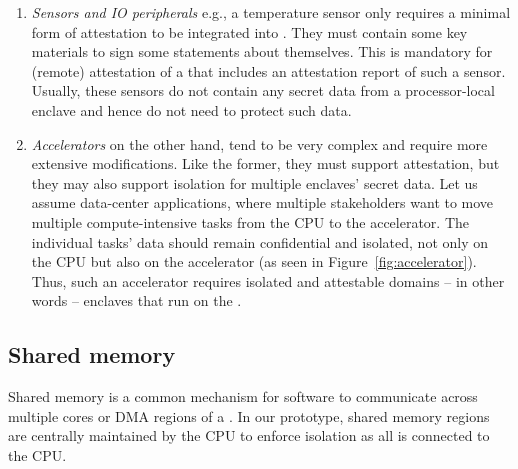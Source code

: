 \begin{enumerate}
\item\emph{Sensors and IO peripherals} e.g., a temperature sensor only requires a minimal form of attestation to be integrated into \name{}. They must contain some key materials to sign some statements about themselves. This is mandatory for (remote) attestation of a \nameenclave that includes an attestation report of such a sensor. Usually, these sensors do not contain any secret data from a processor-local enclave and hence do not need to protect such data.

\item\emph{Accelerators} on the other hand, tend to be very complex and require more extensive modifications. Like the former, they must support attestation, but they may also support isolation for multiple enclaves' secret data. Let us assume data-center applications, where multiple stakeholders want to move multiple compute-intensive tasks from the CPU to the accelerator. The individual tasks' data should remain confidential and isolated, not only on the CPU but also on the accelerator (as seen in Figure~\ref{fig:accelerator}). Thus, such an accelerator requires isolated and attestable domains -- in other words -- enclaves that run on the \sphw. 

\end{enumerate}

\subsection{Shared memory}
\label{sec:approach:sharedMemory}
Shared memory is a common mechanism for software to communicate across multiple cores or DMA regions of a \sphw. In our prototype, shared memory regions are centrally maintained by the CPU to enforce isolation as all \sphw is connected to the CPU.


